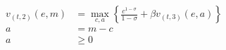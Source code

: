 \begin{align} \tag{consumption}
    v_{(t,2)}(e, m) & = \max_{c, a} \left\{\frac{c^{1-\sigma}}{1-\sigma}  + \beta v_{(t,3)}(e,a) \right\}
    \\
    a               & = m - c
    \\
    a               & \geq 0
\end{align}
